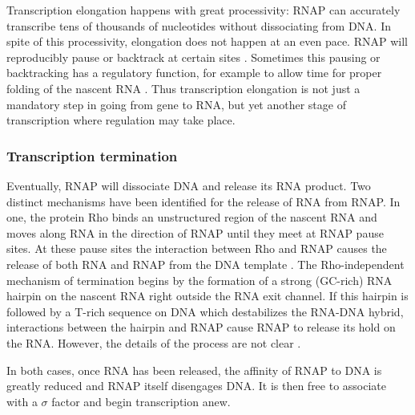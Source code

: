 Transcription elongation happens with great processivity: RNAP can accurately
transcribe tens of thousands of nucleotides without dissociating from DNA. In
spite of this processivity, elongation does not happen at an even pace. RNAP
will reproducibly pause or backtrack at certain sites
\cite{herbert_sequence-resolved_2006}. Sometimes this pausing or backtracking
has a regulatory function, for example to allow time for proper folding of the
nascent RNA \cite{landick_r_regulatory_2006}. Thus transcription elongation is
not just a mandatory step in going from gene to RNA, but yet another stage of
transcription where regulation may take place.

\subsubsection{Transcription termination}
Eventually, RNAP will dissociate DNA and release its RNA product. Two distinct
mechanisms have been identified for the release of RNA from RNAP. In one, the
protein Rho binds an unstructured region of the nascent RNA and moves along RNA
in the direction of RNAP until they meet at RNAP pause sites. At these pause
sites the interaction between Rho and RNAP causes the release of both RNA and
RNAP from the DNA template \cite{ciampi_rho-dependent_2006}. The
Rho-independent mechanism of termination begins by the formation of a strong
(GC-rich) RNA hairpin on the nascent RNA right outside the RNA exit channel. If
this hairpin is followed by a T-rich sequence on DNA which destabilizes the
RNA-DNA hybrid, interactions between the hairpin and RNAP cause RNAP to release
its hold on the RNA. However, the details of the process are not clear
\cite{nudler_transcription_2002}.

In both cases, once RNA has been released, the affinity of RNAP to DNA is
greatly reduced and RNAP itself disengages DNA. It is then free to associate
with a $\sigma$ factor and begin transcription anew.
